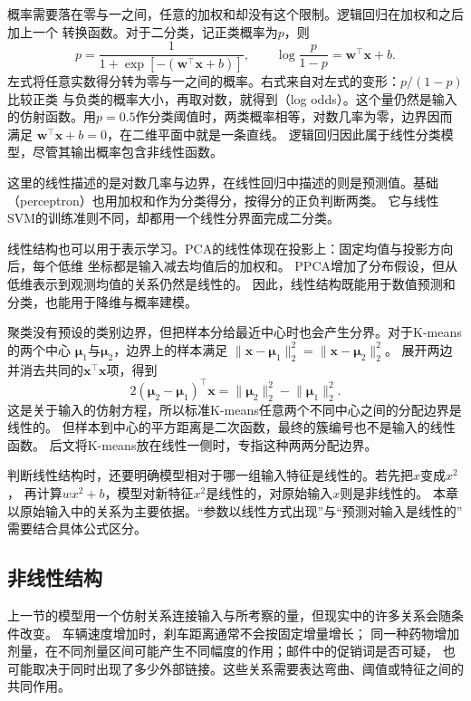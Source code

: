概率需要落在零与一之间，任意的加权和却没有这个限制。逻辑回归在加权和之后加上一个
转换函数。对于二分类，记正类概率为$p$，则
\begin{equation}
  p=\frac{1}{1+\exp[-(\bm{w}^{\top}\bm{x}+b)]},
  \qquad
  \log\frac{p}{1-p}=\bm{w}^{\top}\bm{x}+b.
  \label{eq:models-logistic-structure}
\end{equation}
左式将任意实数得分转为零与一之间的概率。右式来自对左式的变形：$p/(1-p)$比较正类
与负类的概率大小，再取对数，就得到（log odds）。这个量仍然是输入
的仿射函数。用$p=0.5$作分类阈值时，两类概率相等，对数几率为零，边界因而满足
$\bm{w}^{\top}\bm{x}+b=0$，在二维平面中就是一条直线。
逻辑回归因此属于线性分类模型，尽管其输出概率包含非线性函数。

这里的线性描述的是对数几率与边界，在线性回归中描述的则是预测值。基础
（perceptron）也用加权和作为分类得分，按得分的正负判断两类。
它与线性SVM的训练准则不同，却都用一个线性分界面完成二分类。

线性结构也可以用于表示学习。PCA的线性体现在投影上：固定均值与投影方向后，每个低维
坐标都是输入减去均值后的加权和。
PPCA增加了分布假设，但从低维表示到观测均值的关系仍然是线性的。
因此，线性结构既能用于数值预测和分类，也能用于降维与概率建模。

聚类没有预设的类别边界，但把样本分给最近中心时也会产生分界。对于K-means的两个中心
$\bm{\mu}_1$与$\bm{\mu}_2$，边界上的样本满足
$\lVert\bm{x}-\bm{\mu}_1\rVert_2^2=\lVert\bm{x}-\bm{\mu}_2\rVert_2^2$。
展开两边并消去共同的$\bm{x}^{\top}\bm{x}$项，得到
\begin{equation}
  2(\bm{\mu}_2-\bm{\mu}_1)^{\top}\bm{x}
  =\lVert\bm{\mu}_2\rVert_2^2-\lVert\bm{\mu}_1\rVert_2^2.
  \label{eq:models-kmeans-boundary}
\end{equation}
这是关于输入的仿射方程，所以标准K-means任意两个不同中心之间的分配边界是线性的。
但样本到中心的平方距离是二次函数，最终的簇编号也不是输入的线性函数。
后文将K-means放在线性一侧时，专指这种两两分配边界。

判断线性结构时，还要明确模型相对于哪一组输入特征是线性的。若先把$x$变成$x^2$，
再计算$wx^2+b$，模型对新特征$x^2$是线性的，对原始输入$x$则是非线性的。
本章以原始输入中的关系为主要依据。“参数以线性方式出现”与“预测对输入是线性的”
需要结合具体公式区分。

\subsection{非线性结构}
\label{sec:models-nonlinear}

上一节的模型用一个仿射关系连接输入与所考察的量，但现实中的许多关系会随条件改变。
车辆速度增加时，刹车距离通常不会按固定增量增长；
同一种药物增加剂量，在不同剂量区间可能产生不同幅度的作用；邮件中的促销词是否可疑，
也可能取决于同时出现了多少外部链接。这些关系需要表达弯曲、阈值或特征之间的共同作用。

